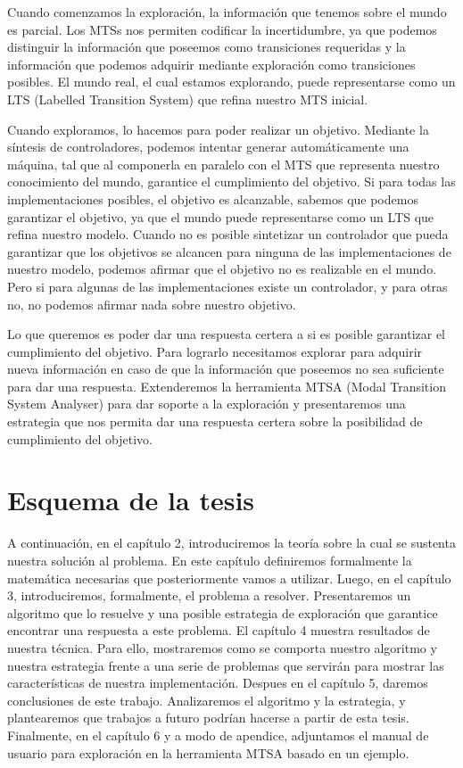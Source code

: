 Cuando comenzamos la exploración, la información que tenemos sobre el mundo es parcial. Los MTSs nos permiten codificar 
la incertidumbre, ya que podemos distinguir la información que poseemos como transiciones requeridas y la información 
que podemos adquirir mediante exploración como transiciones posibles. El mundo real, el cual estamos explorando, puede 
representarse como un LTS (Labelled Transition System) que refina nuestro MTS inicial.


Cuando exploramos, lo hacemos para poder realizar un objetivo. Mediante la síntesis de controladores, podemos intentar 
generar automáticamente una máquina, tal que al componerla en paralelo con el MTS que representa nuestro conocimiento 
del mundo, garantice el cumplimiento del objetivo. 
Si para todas las implementaciones posibles, el objetivo es alcanzable, sabemos que podemos garantizar el objetivo, ya 
que el mundo puede representarse como un LTS que refina nuestro modelo. 
Cuando no es posible sintetizar un controlador que pueda garantizar que los objetivos se alcancen para ninguna de las 
implementaciones de nuestro modelo, podemos afirmar que el objetivo no es realizable en el mundo. Pero si para algunas 
de las implementaciones existe un controlador, y para otras no, no podemos afirmar nada sobre nuestro objetivo.


Lo que queremos es poder dar una respuesta certera a si es posible garantizar el cumplimiento del objetivo. 
Para lograrlo necesitamos explorar para adquirir nueva información en caso de que la información que poseemos no sea 
suficiente para dar una respuesta. Extenderemos la herramienta MTSA (Modal Transition System Analyser) para dar soporte 
a la exploración y presentaremos una estrategia que nos permita dar una respuesta certera sobre la posibilidad de 
cumplimiento del objetivo.

\section{Esquema de la tesis}

A continuación, en el capítulo 2, introduciremos la teoría sobre la cual se 
sustenta nuestra 
solución al problema. 
En este capítulo definiremos formalmente la matemática necesarias que 
posteriormente vamos a utilizar. Luego, en el capítulo 3, introduciremos, 
formalmente, el problema a resolver. Presentaremos un algoritmo que lo resuelve 
y una posible estrategia de exploración que garantice encontrar una respuesta a 
este problema. El capítulo 4 muestra resultados de nuestra técnica.
Para ello, mostraremos como se comporta nuestro algoritmo y nuestra estrategia 
frente a una serie de problemas que servirán para mostrar las características 
de nuestra implementación. Despues en el capítulo 5, daremos conclusiones de 
este trabajo. Analizaremos el algoritmo y la estrategia, y plantearemos que 
trabajos a futuro podrían hacerse a partir de esta tesis. 
Finalmente, en el capítulo 6 y a modo de apendice, adjuntamos el manual de 
usuario para exploración en la herramienta MTSA basado en un ejemplo.
